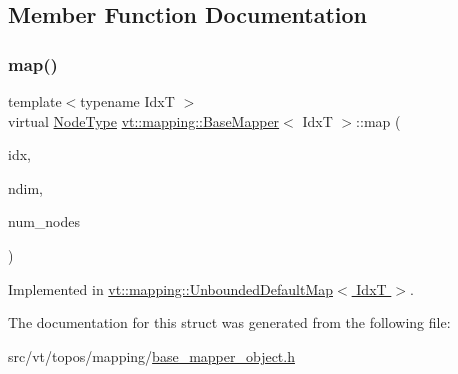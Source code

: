 \subsection{Member Function Documentation}
\mbox{\label{structvt_1_1mapping_1_1_base_mapper_a940a3ea301c0f60b2b88218afbce5a4f}} 
\subsubsection{\texorpdfstring{map()}{map()}}
{\footnotesize\ttfamily template$<$typename IdxT $>$ \\
virtual \hyperlink{namespacevt_a866da9d0efc19c0a1ce79e9e492f47e2}{Node\+Type} \hyperlink{structvt_1_1mapping_1_1_base_mapper}{vt\+::mapping\+::\+Base\+Mapper}$<$ IdxT $>$\+::map (\begin{DoxyParamCaption}\item[{IdxT $\ast$}]{idx,  }\item[{int}]{ndim,  }\item[{\hyperlink{namespacevt_a866da9d0efc19c0a1ce79e9e492f47e2}{Node\+Type}}]{num\+\_\+nodes }\end{DoxyParamCaption})\hspace{0.3cm}{\ttfamily [pure virtual]}}



Implemented in \hyperlink{structvt_1_1mapping_1_1_unbounded_default_map_a8617e6a789985a7140d09a8be6bc3a47}{vt\+::mapping\+::\+Unbounded\+Default\+Map$<$ Idx\+T $>$}.



The documentation for this struct was generated from the following file\+:\begin{DoxyCompactItemize}
\item 
src/vt/topos/mapping/\hyperlink{base__mapper__object_8h}{base\+\_\+mapper\+\_\+object.\+h}\end{DoxyCompactItemize}

